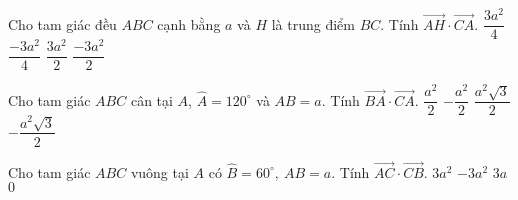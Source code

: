 \begin{ex}%
	Cho tam giác đều $ABC$ cạnh bằng $a$ và $H$ là trung điểm $BC$. Tính $\overrightarrow{AH}\cdot \overrightarrow{CA}$.
	\choice
	{$\dfrac{3a^2}{4}$}
	{\True $\dfrac{-3a^2}{4}$}
	{$\dfrac{3a^2}{2}$}
	{$\dfrac{-3a^2}{2}$}
\end{ex}

\begin{ex}%
	Cho tam giác $ABC$ cân tại $A$, $\widehat{A}=120^\circ $ và $AB=a$. Tính $\overrightarrow{BA}\cdot \overrightarrow{CA}$.
	\choice
	{$\dfrac{a^2}{2}$}
	{\True $-\dfrac{a^2}{2}$}
	{$\dfrac{a^2\sqrt{3}}{2}$}
	{$-\dfrac{a^2\sqrt{3}}{2}$}
\end{ex}

\begin{ex}%
	Cho tam giác $ABC$ vuông tại $A$ có $\widehat B=60^\circ ,\ AB=a$. Tính $\overrightarrow{AC}\cdot \overrightarrow{CB}$.
	\choice
	{$3a^2$}
	{\True $-3a^2$}
	{$3a$}
	{$0$}
\end{ex}

